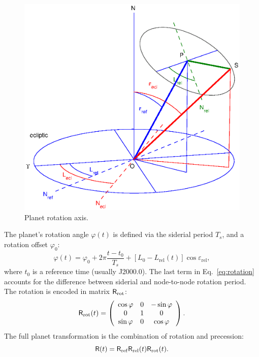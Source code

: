 \documentclass[Orbiter Technical Reference.tex]{subfiles}
\begin{document}
\begin{figure}[ht]
\includegraphics[width=\textwidth]{fig2.eps}
\caption{Planet rotation axis.}
\label{fig:prec_ecl}
\end{figure}
The planet's rotation angle $\varphi(t)$ is defined via the siderial period $T_s$, and a rotation offset $\varphi_0$:
\begin{equation}\label{eq:rotation}
\varphi(t) = \varphi_0 + 2\pi \frac{t-t_0}{T_s} + [L_0 - L_\mathrm{rel}(t)] \cos \varepsilon_\mathrm{rel},
\end{equation}
where $t_0$ is a reference time (usually J2000.0). The last term in Eq.~\ref{eq:rotation} accounts for the difference between siderial and node-to-node rotation period.
The rotation is encoded in matrix $\mathsf{R}_\mathrm{rot}$:
\begin{equation}
\mathsf{R}_\mathrm{rot}(t) = \left( \begin{array}{ccc}
\cos\varphi & 0 & -\sin\varphi \\
0 & 1 & 0 \\
\sin\varphi & 0 & \cos\varphi
\end{array} \right).
\end{equation}
The full planet transformation is the combination of rotation and precession:
\begin{equation}\label{eq:fullrot}
\mathsf{R}(t) = \mathsf{R}_\mathrm{ref} \mathsf{R}_\mathrm{rel}(t) \mathsf{R}_\mathrm{rot}(t).
\end{equation}
\end{document}
